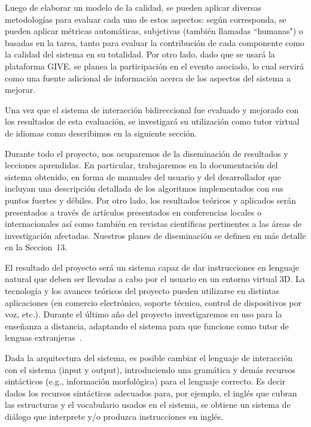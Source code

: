 Luego de elaborar un modelo de la calidad, se pueden aplicar diversas
metodolog\'ias para evaluar cada uno de estos aspectos: seg\'un corresponda, se
pueden aplicar m\'etricas autom\'aticas, subjetivas (tambi\'en llamadas
``humanas") o basadas en la tarea, tanto para evaluar la contribuci\'on de cada
componente como la calidad del sistema en su totalidad.
Por otro lado, dado que se usar\'a la plataforma GIVE, se planea la
participaci\'on en el evento asociado, lo cual servir\'a como una fuente
adicional de informaci\'on acerca de los aspectos del sistema a mejorar.

Una vez que el sistema de interacci\'on bidireccional fue evaluado y mejorado
con los resultados de esta evaluaci\'on,
se investigar\'a su utilizaci\'on
como tutor virtual de idiomas como describimos en la siguiente secci\'on.


Durante todo el proyecto, nos ocuparemos de la diseminaci\'on de resultados y
lecciones aprendidas.  En particular, trabajaremos en la documentaci\'on del
sistema obtenido, en forma de manuales del usuario y del desarrollador que
incluyan una descripci\'on detallada de los algoritmos implementados con sus
puntos fuertes y d\'ebiles.
Por otro lado, los resultados te\'oricos y aplicados ser\'an presentados a
trav\'es de art\'iculos presentados en conferencias locales o internacionales
as\'i como tambi\'en en revistas cient\'ificas pertinentes a las \'areas de
investigaci\'on afectadas.  Nuestros
planes de diseminaci\'on se definen en m\'as detalle en la Seccion~13.




El resultado del proyecto ser\'a un sistema capaz de dar instrucciones
en lenguaje natural que deben ser llevadas a cabo por el usuario en un
entorno virtual 3D.  La tecnolog\'ia y los avances te\'oricos del proyecto
pueden utilizarse en distintas aplicaciones (en comercio electr\'onico,
soporte t\'ecnico, control de dispositivos por voz, etc.).  Durante el
\'ultimo a\~no del proyecto investigaremos su uso para la ense\~nanza a
distancia, adaptando el sistema para que funcione como tutor de lenguas
extranjeras~\citep{Eskenazi09,Wik09}.

Dada la arquitectura del sistema, es posible cambiar el lenguaje de
interacci\'on con el sistema (input y output), introduciendo
una gram\'atica y dem\'as recursos sint\'acticos (e.g., informaci\'on
morfol\'ogica) para el lenguaje correcto.  Es decir dados los recursos
sint\'acticos adecuados para, por ejemplo, el ingl\'es que cubran las
estructuras y el vocabulario usados en el sistema, se obtiene un sistema
de di\'alogo que interprete y/o produzca instrucciones en ingl\'es.


